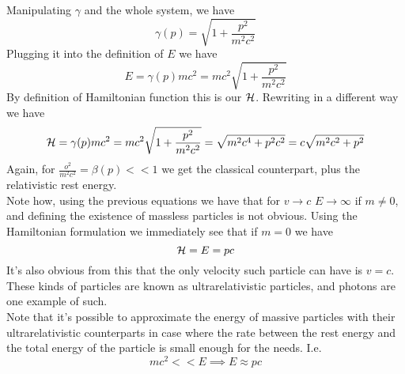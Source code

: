 \documentclass[../admech.tex]{subfiles}
\begin{document}
Manipulating $\gamma$ and the whole system, we have
\begin{equation}
	\gamma(p)=\sqrt{1+\frac{p^2}{m^2c^2}}
	\label{eq:gammaplor}
\end{equation}
Plugging it into the definition of $E$ we have
\begin{equation}
	E=\gamma(p)mc^2=mc^2\sqrt{1+\frac{p^2}{m^2c^2}}
	\label{eq:relhamiltonian}
\end{equation}
By definition of Hamiltonian function this is our $\mathcal{H}$. Rewriting in a different way we have
\begin{equation}
	\mathcal{H}=\gamma(p)mc^2=mc^2\sqrt{1+\frac{p^2}{m^2c^2}}=\sqrt{m^2c^4+p^2c^2}=c\sqrt{m^2c^2+p^2}
	\label{eq:hamiltonianrel}
\end{equation}
Again, for $\frac{o^2}{m^2c^2}=\beta(p)<<1$ we get the classical counterpart, plus the relativistic rest energy.\\
%
Note how, using the previous equations we have that for $v\to c$ $E\to\infty$ if $m\ne0$, and defining the existence of massless particles is not obvious. Using the Hamiltonian formulation we immediately see that if $m=0$ we have
\begin{equation}
	\mathcal{H}=E=pc
	\label{eq:relen}
\end{equation}
It's also obvious from this that the only velocity such particle can have is $v=c$. These kinds of particles are known as ultrarelativistic particles, and photons are one example of such.\\
Note that it's possible to approximate the energy of massive particles with their ultrarelativistic counterparts in case where the rate between the rest energy and the total energy of the particle is small enough for the needs. I.e.
\begin{equation}
	mc^2<<E\implies E\approx pc
	\label{eq:relapprox}
\end{equation}
\end{document}

